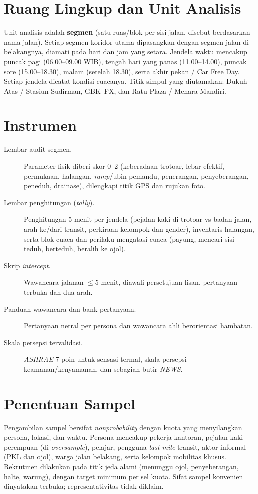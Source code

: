 \documentclass[11pt,a4paper]{report}
\begin{document}
\section{Ruang Lingkup dan Unit Analisis}
Unit analisis adalah \textbf{segmen} (satu ruas/blok per sisi jalan, disebut berdasarkan nama
jalan). Setiap segmen koridor utama dipasangkan dengan segmen jalan di belakangnya, diamati pada
hari dan jam yang setara. Jendela waktu mencakup puncak pagi (06.00--09.00 WIB), tengah hari yang
panas (11.00--14.00), puncak sore (15.00--18.30), malam (setelah 18.30), serta akhir pekan / Car
Free Day. Setiap jendela dicatat kondisi cuacanya. Titik simpul yang diutamakan: Dukuh Atas /
Stasiun Sudirman, GBK--FX, dan Ratu Plaza / Menara Mandiri.

\section{Instrumen}
\begin{description}
  \item[Lembar audit segmen.] Parameter fisik diberi skor 0--2 (keberadaan trotoar, lebar
    efektif, permukaan, halangan, \textit{ramp}/ubin pemandu, penerangan, penyeberangan, peneduh,
    drainase), dilengkapi titik GPS dan rujukan foto.
  \item[Lembar penghitungan (\textit{tally}).] Penghitungan 5 menit per jendela (pejalan kaki di
    trotoar vs badan jalan, arah ke/dari transit, perkiraan kelompok dan gender), inventaris
    halangan, serta blok cuaca dan perilaku mengatasi cuaca (payung, mencari sisi teduh, berteduh,
    beralih ke ojol).
  \item[Skrip \textit{intercept}.] Wawancara jalanan $\leq 5$ menit, diawali persetujuan lisan,
    pertanyaan terbuka dan dua arah.
  \item[Panduan wawancara dan bank pertanyaan.] Pertanyaan netral per persona dan wawancara ahli
    berorientasi hambatan.
  \item[Skala persepsi tervalidasi.] \emph{ASHRAE} 7 poin untuk sensasi termal, skala persepsi
    keamanan/kenyamanan, dan sebagian butir \emph{NEWS}.
\end{description}

\section{Penentuan Sampel}
Pengambilan sampel bersifat \emph{nonprobability} dengan kuota yang menyilangkan persona,
lokasi, dan waktu. Persona mencakup pekerja kantoran, pejalan kaki perempuan (di-\emph{oversample}),
pelajar, pengguna \emph{last-mile} transit, aktor informal (PKL dan ojol), warga jalan belakang,
serta kelompok mobilitas khusus. Rekrutmen dilakukan pada titik jeda alami (menunggu ojol,
penyeberangan, halte, warung), dengan target minimum per sel kuota. Sifat sampel konvenien
dinyatakan terbuka; representativitas tidak diklaim.
\end{document}
